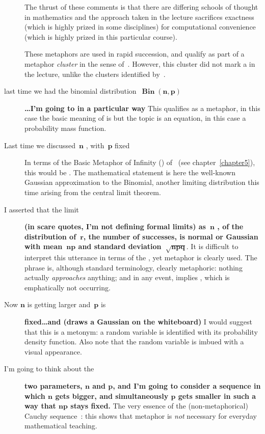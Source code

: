 \begin{description}
{  The thrust of these comments is that there are differing schools of
  thought in mathematics and the approach taken in the lecture
  sacrifices exactness (which is highly prized in some disciplines)
  for computational convenience (which is highly prized in this
  particular course).
  
  These metaphors are used in rapid succession, and qualify as part of
  a metaphor \emph{cluster} in the sense of~.  However,
  this cluster did not mark a  in the
  lecture, unlike the clusters identified by~.}
  \item[last time we had the binomial
    distribution~$\mathbf{\operatorname{\mathbf{Bin}}\left({n,p}\right)}$]
    {\bf\ldots I'm going to  in
      a particular way} This qualifies as a metaphor, in this case the
    basic meaning of  is  but the topic is
    an equation, in this case a probability mass function.

  \item[Last time we discussed~$\mathbf{n}$ \metaphor{getting larger},
    with~$\mathbf{p}$ fixed] In terms of the Basic Metaphor of
    Infinity (\bmi) of~ (see
    chapter~\ref{chapter5}), this would be .  The mathematical statement is here the well-known
    Gaussian approximation to the Binomial, another limiting
    distribution this time arising from the central limit theorem.
    
  \item[I asserted that the limit] {\bf (in scare quotes, I'm not
    defining formal limits) as~$\mathbf{n}$ , of the distribution of~$\mathbf{r}$, the number of
    successes, is normal or Gaussian with mean~$\mathbf{np}$ and
    standard deviation~$\mathbf{\sqrt{npq}}$}.  It is difficult to
    interpret this utterance in terms of the \bmi, yet metaphor is
    clearly used.  The phrase  is,
    although standard terminology, clearly metaphoric: nothing
    actually \emph{approaches} anything; and in any event,
     implies , which is emphatically not occurring.
  \item[Now $\mathbf{n}$ is getting larger and~$\mathbf{p}$ is] {\bf
    fixed\ldots and  (draws a Gaussian on
    the whiteboard)} I would suggest that this is a metonym: a random
    variable is identified with its probability density function.
    Also note that the random variable is imbued with a visual
    appearance.
  \item[I'm going to think about the] {\bf two parameters,
    $\mathbf{n}$ and $\mathbf{p}$, and I'm going to consider a
    sequence in which $\mathbf{n}$ gets bigger, and simultaneously
    $\mathbf{p}$ gets smaller in such a way that $\mathbf{np}$ stays
    fixed.} The very essence of the (non-metaphorical) Cauchy
    sequence~\citep{hardy1952}: this shows that metaphor is \emph{not}
    necessary for everyday mathematical teaching.
\end{description}

